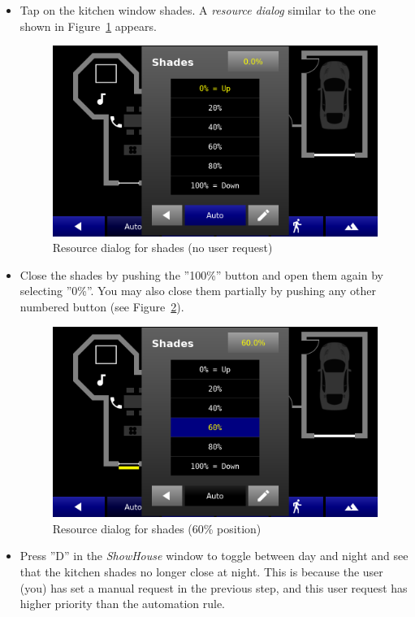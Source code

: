 \documentclass[12pt,english,parskip=half,headheight=19pt]{scrreprt}
\begin{document}
\begin{itemize}[$\blacktriangleright$]
  \item
    Tap on the kitchen window shades. A \textit{resource dialog} similar to the one shown in
    Figure~\ref{fig:tutorial-floorplan-shades-auto} appears.

    \begin{figure}[ht]
      \centering
      \includegraphics[width=0.65\linewidth]{figs/wallclock-floorplan-shades-auto.png}
      \caption[l]{Resource dialog for shades (no user request)}
      \label{fig:tutorial-floorplan-shades-auto}
    \end{figure}

  \item
    Close the shades by pushing the ''100\%'' button and open them again by selecting
    ''0\%''. You may also close them partially by pushing any other numbered button
    (see Figure~\ref{fig:tutorial-floorplan-shades-user}).

    \begin{figure}[ht]
      \centering
      \includegraphics[width=0.65\linewidth]{figs/wallclock-floorplan-shades-user.png}
      \caption[l]{Resource dialog for shades (60\% position)}
      \label{fig:tutorial-floorplan-shades-user}
    \end{figure}

  \item Press ''D'' in  the \textit{ShowHouse} window to toggle between day and night and
    see that the kitchen shades no longer close at night. This is because the user (you) has set a
    manual request in the previous step, and this user request has higher priority than the
    automation rule.


\end{itemize}
\end{document}

